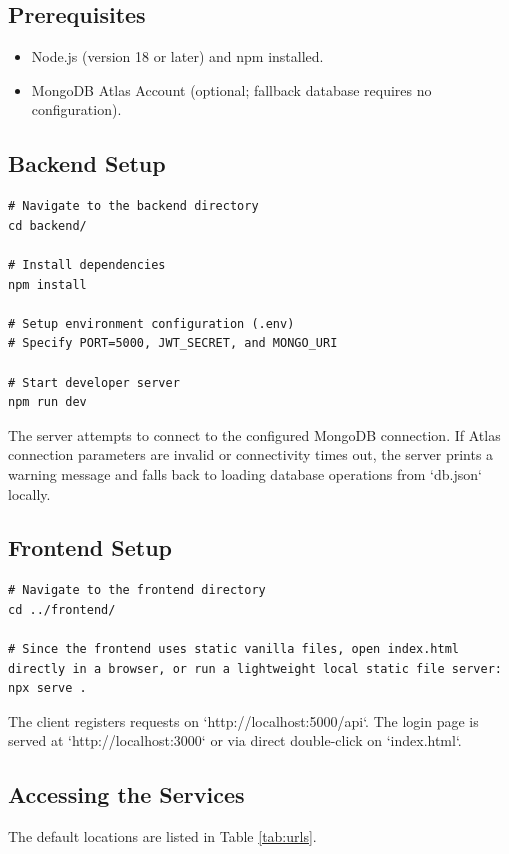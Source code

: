 \documentclass[12pt,a4paper]{report}
\begin{document}
\subsection{Prerequisites}
\begin{itemize}
    \item Node.js (version 18 or later) and npm installed.
    \item MongoDB Atlas Account (optional; fallback database requires no configuration).
\end{itemize}

\subsection{Backend Setup}
\begin{lstlisting}[caption={Commands to build and deploy backend server}, label={lst:deploy_backend}]
# Navigate to the backend directory
cd backend/

# Install dependencies
npm install

# Setup environment configuration (.env)
# Specify PORT=5000, JWT_SECRET, and MONGO_URI

# Start developer server
npm run dev
\end{lstlisting}

The server attempts to connect to the configured MongoDB connection. If Atlas connection parameters are invalid or connectivity times out, the server prints a warning message and falls back to loading database operations from `db.json` locally.

\subsection{Frontend Setup}
\begin{lstlisting}[caption={Commands to run frontend client}, label={lst:deploy_frontend}]
# Navigate to the frontend directory
cd ../frontend/

# Since the frontend uses static vanilla files, open index.html directly in a browser, or run a lightweight local static file server:
npx serve .
\end{lstlisting}

The client registers requests on `http://localhost:5000/api`. The login page is served at `http://localhost:3000` or via direct double-click on `index.html`.

\subsection{Accessing the Services}
The default locations are listed in Table \ref{tab:urls}.
\end{document}

